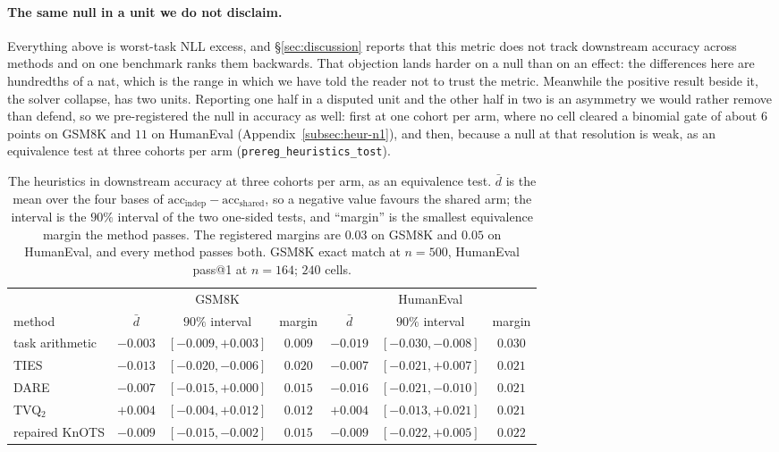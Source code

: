 \paragraph{The same null in a unit we do not disclaim.} Everything above is
worst-task NLL excess, and \S\ref{sec:discussion} reports that this metric does
not track downstream accuracy across methods and on one benchmark ranks them
backwards. That objection lands harder on a null than on an effect: the
differences here are hundredths of a nat, which is the range in which we have
told the reader not to trust the metric. Meanwhile the positive result beside
it, the solver collapse, has two units. Reporting one half in a disputed unit
and the other half in two is an asymmetry we would rather remove than defend,
so we pre-registered the null in accuracy as well: first at one cohort per
arm, where no cell cleared a binomial gate of about $6$ points on GSM8K and
$11$ on HumanEval (Appendix~\ref{subsec:heur-n1}), and then, because a null at
that resolution is weak, as an equivalence test at three cohorts per arm
(\texttt{prereg\_heuristics\_tost}).

\begin{table}[t]
\centering
\small
\caption{The heuristics in downstream accuracy at three cohorts per arm, as an
equivalence test. $\bar d$ is the mean over the four bases of
$\mathrm{acc}_{\mathrm{indep}} - \mathrm{acc}_{\mathrm{shared}}$, so a negative
value favours the shared arm; the interval is the $90\%$ interval of the two
one-sided tests, and ``margin'' is the smallest equivalence margin the method
passes. The registered margins are $0.03$ on GSM8K and $0.05$ on HumanEval, and
every method passes both. GSM8K exact match at $n = 500$, HumanEval pass@1 at
$n = 164$; $240$ cells.}
\label{tab:heur-tost}
\begin{tabular}{lcccccc}
\toprule
 & \multicolumn{3}{c}{GSM8K} & \multicolumn{3}{c}{HumanEval} \\
method & $\bar d$ & $90\%$ interval & margin & $\bar d$ & $90\%$ interval & margin \\
\midrule
task arithmetic & $-0.003$ & $[-0.009, +0.003]$ & $0.009$ & $-0.019$ & $[-0.030, -0.008]$ & $0.030$ \\
TIES & $-0.013$ & $[-0.020, -0.006]$ & $0.020$ & $-0.007$ & $[-0.021, +0.007]$ & $0.021$ \\
DARE & $-0.007$ & $[-0.015, +0.000]$ & $0.015$ & $-0.016$ & $[-0.021, -0.010]$ & $0.021$ \\
TVQ$_2$ & $+0.004$ & $[-0.004, +0.012]$ & $0.012$ & $+0.004$ & $[-0.013, +0.021]$ & $0.021$ \\
repaired KnOTS & $-0.009$ & $[-0.015, -0.002]$ & $0.015$ & $-0.009$ & $[-0.022, +0.005]$ & $0.022$ \\
\bottomrule
\end{tabular}
\end{table}

